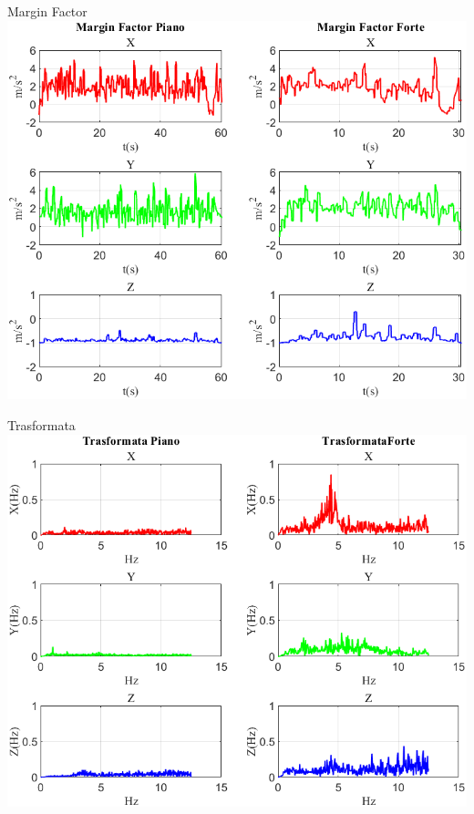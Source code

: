 \documentclass[beamer]{standalone}
\begin{document}
		\begin{frame}{{Margin Factor}}
				\centering\includegraphics[height=.8\textheight]{figure/Acc/Margin Factor}
			\end{frame}
	
	\begin{frame}{{Trasformata}}
		\centering\includegraphics[height=.8\textheight]{figure/Acc/Trasformata/Trasformata}
	\end{frame}
	
\end{document}
